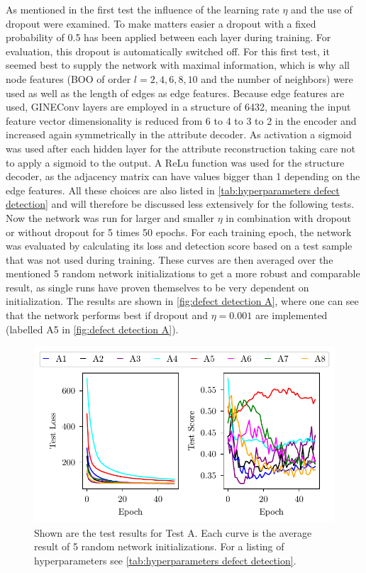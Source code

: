 \documentclass[11pt,a4paper]{article}
\begin{document}
As mentioned in the first test the influence of the learning rate $\eta$ and the use of dropout were examined. 
To make matters easier a dropout with a fixed probability of 0.5 has been applied between each layer during training. 
For evaluation, this dropout is automatically switched off. 
For this first test, it seemed best to supply the network with maximal information, which is why all node features (BOO of order $l=2,4,6,8,10$ and the number of neighbors) were used as well as the length of edges as edge features. 
Because edge features are used, GINEConv layers are employed in a structure of 6432, meaning the input feature vector dimensionality is reduced from 6 to 4 to 3 to 2 in the encoder and increased again symmetrically in the attribute decoder. 
As activation a sigmoid was used after each hidden layer for the attribute reconstruction taking care not to apply a sigmoid to the output. 
A ReLu function was used for the structure decoder, as the adjacency matrix can have values bigger than 1 depending on the edge features. 
All these choices are also listed in \autoref{tab:hyperparameters defect detection} and will therefore be discussed less extensively for the following tests. \\
Now the network was run for larger and smaller $\eta$ in combination with dropout or without dropout for 5 times 50 epochs. 
For each training epoch, the network was evaluated by calculating its loss and detection score based on a test sample that was not used during training.
These curves are then averaged over the mentioned 5 random network initializations to get a more robust and comparable result, as single runs have proven themselves to be very dependent on initialization. 
The results are shown in \autoref{fig:defect detection A}, where one can see that the network performs best if dropout and $\eta=0.001$ are implemented (labelled A5 in \autoref{fig:defect detection A}). 

\begin{figure}[htbp]
\centering
\includegraphics{images/plots/defect_detection_A.pdf}
\caption{Shown are the test results for Test A. Each curve is the average result of 5 random network initializations. For a listing of hyperparameters see \autoref{tab:hyperparameters defect detection}.}
\label{fig:defect detection A}
\end{figure}
\end{document}
